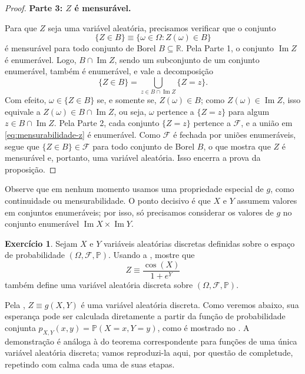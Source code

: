 \documentclass[12pt,portuguese]{article}
\theoremstyle{definition}
\newtheorem{exercise}{Exercício}
\begin{document}
\begin{proof}
\medskip
\noindent\textbf{Parte 3: $Z$ é mensurável.}

Para que $Z$ seja uma variável aleatória, precisamos verificar que o conjunto
\[
  \{Z\in B\}\equiv\{\omega\in\Omega:Z(\omega)\in B\}
\]
é mensurável para todo conjunto de Borel $B\subseteq\mathbb{R}$. Pela Parte 1,
o conjunto $\operatorname{Im}Z$ é enumerável. Logo, $B\cap\operatorname{Im}Z$,
sendo um subconjunto de um conjunto enumerável, também é enumerável, e vale a
decomposição
\begin{equation}\label{eq:mensurabilidade-z}
  \{Z\in B\}
  =\bigcup_{z\in B\cap\operatorname{Im}Z}\{Z=z\}.
\end{equation}
Com efeito, $\omega\in\{Z\in B\}$ se, e somente se, $Z(\omega)\in B$; como
$Z(\omega)\in\operatorname{Im}Z$, isso equivale a
$Z(\omega)\in B\cap\operatorname{Im}Z$, ou seja, $\omega$ pertence a
$\{Z=z\}$ para algum $z\in B\cap\operatorname{Im}Z$. Pela Parte 2, cada
conjunto $\{Z=z\}$ pertence a $\mathcal{F}$, e a união em
\eqref{eq:mensurabilidade-z} é enumerável. Como $\mathcal{F}$ é fechada por
uniões enumeráveis, segue que $\{Z\in B\}\in\mathcal{F}$ para todo conjunto
de Borel $B$, o que mostra que $Z$ é mensurável e, portanto, uma variável
aleatória. Isso encerra a prova da proposição.
\end{proof}



Observe que em nenhum momento usamos uma propriedade especial de $g$, como
continuidade ou mensurabilidade. O ponto decisivo é que $X$ e $Y$ assumem
valores em conjuntos enumeráveis; por isso, só precisamos considerar os
valores de $g$ no conjunto enumerável
$\operatorname{Im}X\times\operatorname{Im}Y$.

\begin{exercise}\label{exercise:cos-exp-va}
Sejam $X$ e $Y$ variáveis aleatórias discretas definidas sobre o espaço de probabilidade
$(\Omega,\mathcal{F},\mathbb{P})$. 
Usando a , mostre que
\[
Z\equiv \frac{\cos(X)}{1+e^Y}
\]
também define uma variável aleatória discreta sobre $(\Omega,\mathcal{F},\mathbb{P})$.
\end{exercise}

Pela , $Z\equiv g(X,Y)$ é uma variável aleatória discreta.
Como veremos abaixo, sua esperança pode ser calculada diretamente a partir da
função de probabilidade conjunta $p_{X,Y}(x, y) = \mathbb{P}(X = x, Y = y)$,
como é mostrado no . A demonstração é análoga à do
teorema correspondente para funções de uma única variável aleatória discreta;
vamos reproduzi-la aqui, por questão de completude, repetindo com calma cada
uma de suas etapas.
\end{document}
